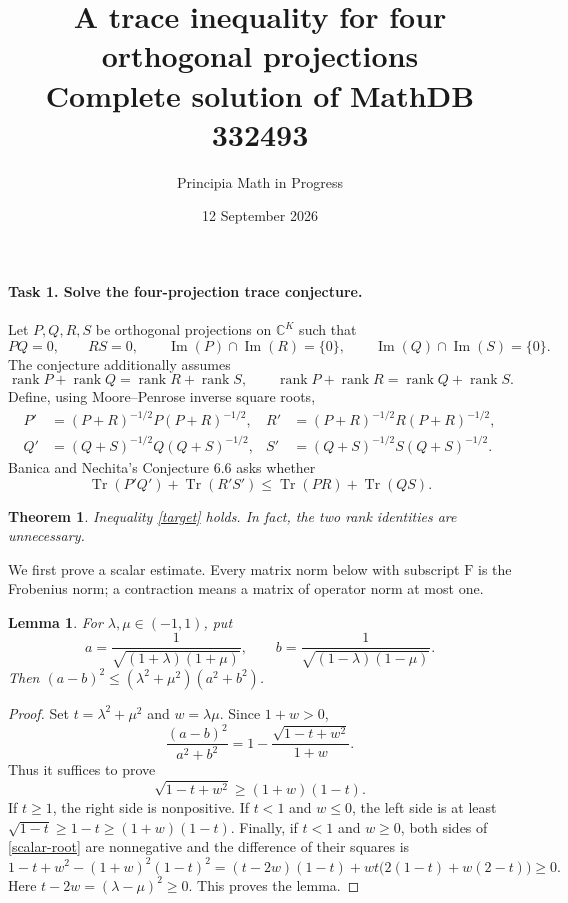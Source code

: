 \documentclass[11pt]{article}
\title{A trace inequality for four orthogonal projections\\
\large Complete solution of MathDB 332493}
\author{Principia Math in Progress}
\date{12 September 2026}
\newcommand{\Tr}{\operatorname{Tr}}
\newcommand{\rank}{\operatorname{rank}}
\newcommand{\im}{\operatorname{Im}}
\newtheorem{lemma}{Lemma}
\newtheorem{theorem}{Theorem}
\begin{document}
\maketitle

\paragraph{Task 1. Solve the four-projection trace conjecture.}
Let $P,Q,R,S$ be orthogonal projections on $\mathbb C^K$ such that
\[
 PQ=0,\qquad RS=0,\qquad
 \im(P)\cap\im(R)=\{0\},\qquad
 \im(Q)\cap\im(S)=\{0\}.
\]
The conjecture additionally assumes
\[
 \rank P+\rank Q=\rank R+\rank S,\qquad
 \rank P+\rank R=\rank Q+\rank S.
\]
Define, using Moore--Penrose inverse square roots,
\[
\begin{aligned}
 P'&=(P+R)^{-1/2}P(P+R)^{-1/2},&
 R'&=(P+R)^{-1/2}R(P+R)^{-1/2},\\
 Q'&=(Q+S)^{-1/2}Q(Q+S)^{-1/2},&
 S'&=(Q+S)^{-1/2}S(Q+S)^{-1/2}.
\end{aligned}
\]
Banica and Nechita's Conjecture 6.6 asks whether
\begin{equation}\label{target}
 \Tr(P'Q')+\Tr(R'S')\leq \Tr(PR)+\Tr(QS).
\end{equation}

\begin{theorem}
Inequality \eqref{target} holds. In fact, the two rank identities are
unnecessary.
\end{theorem}

We first prove a scalar estimate. Every matrix norm below with subscript
$\mathrm F$ is the Frobenius norm; a contraction means a matrix of
operator norm at most one.

\begin{lemma}\label{scalar}
For $\lambda,\mu\in(-1,1)$, put
\[
 a=\frac1{\sqrt{(1+\lambda)(1+\mu)}},\qquad
 b=\frac1{\sqrt{(1-\lambda)(1-\mu)}}.
\]
Then $(a-b)^2\leq(\lambda^2+\mu^2)(a^2+b^2)$.
\end{lemma}
\begin{proof}
Set $t=\lambda^2+\mu^2$ and $w=\lambda\mu$. Since $1+w>0$,
\[
 \frac{(a-b)^2}{a^2+b^2}
 =1-\frac{\sqrt{1-t+w^2}}{1+w}.
\]
Thus it suffices to prove
\begin{equation}\label{scalar-root}
 \sqrt{1-t+w^2}\geq(1+w)(1-t).
\end{equation}
If $t\geq1$, the right side is nonpositive.
If $t<1$ and $w\leq0$, the left side is at least
$\sqrt{1-t}\geq1-t\geq(1+w)(1-t)$.
Finally, if $t<1$ and $w\geq0$, both sides of
\eqref{scalar-root} are nonnegative and the difference of their squares is
\[
 1-t+w^2-(1+w)^2(1-t)^2
 =(t-2w)(1-t)+wt\bigl(2(1-t)+w(2-t)\bigr)\geq0.
\]
Here $t-2w=(\lambda-\mu)^2\geq0$. This proves the lemma.
\end{proof}
\end{document}
